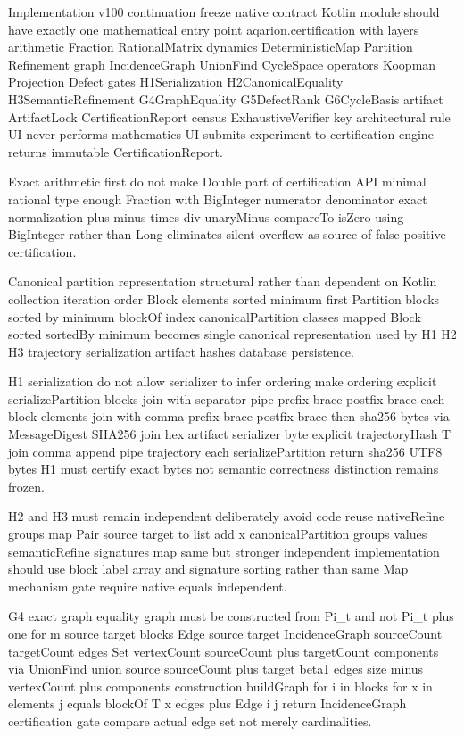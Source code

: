 Implementation v100 continuation freeze native contract Kotlin module should have exactly one mathematical entry point aqarion.certification with layers arithmetic Fraction RationalMatrix dynamics DeterministicMap Partition Refinement graph IncidenceGraph UnionFind CycleSpace operators Koopman Projection Defect gates H1Serialization H2CanonicalEquality H3SemanticRefinement G4GraphEquality G5DefectRank G6CycleBasis artifact ArtifactLock CertificationReport census ExhaustiveVerifier key architectural rule UI never performs mathematics UI submits experiment to certification engine returns immutable CertificationReport.

Exact arithmetic first do not make Double part of certification API minimal rational type enough Fraction with BigInteger numerator denominator exact normalization plus minus times div unaryMinus compareTo isZero using BigInteger rather than Long eliminates silent overflow as source of false positive certification.

Canonical partition representation structural rather than dependent on Kotlin collection iteration order Block elements sorted minimum first Partition blocks sorted by minimum blockOf index canonicalPartition classes mapped Block sorted sortedBy minimum becomes single canonical representation used by H1 H2 H3 trajectory serialization artifact hashes database persistence.

H1 serialization do not allow serializer to infer ordering make ordering explicit serializePartition blocks join with separator pipe prefix brace postfix brace each block elements join with comma prefix brace postfix brace then sha256 bytes via MessageDigest SHA256 join hex artifact serializer byte explicit trajectoryHash T join comma append pipe trajectory each serializePartition return sha256 UTF8 bytes H1 must certify exact bytes not semantic correctness distinction remains frozen.

H2 and H3 must remain independent deliberately avoid code reuse nativeRefine groups map Pair source target to list add x canonicalPartition groups values semanticRefine signatures map same but stronger independent implementation should use block label array and signature sorting rather than same Map mechanism gate require native equals independent.

G4 exact graph equality graph must be constructed from Pi_t and not Pi_t plus one for m source target blocks Edge source target IncidenceGraph sourceCount targetCount edges Set vertexCount sourceCount plus targetCount components via UnionFind union source sourceCount plus target beta1 edges size minus vertexCount plus components construction buildGraph for i in blocks for x in elements j equals blockOf T x edges plus Edge i j return IncidenceGraph certification gate compare actual edge set not merely cardinalities.

